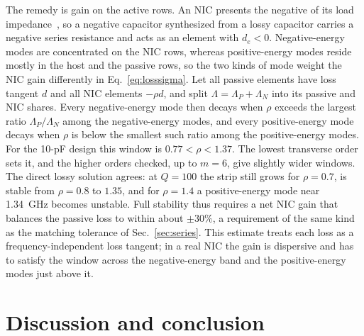 \documentclass[aps,prapplied,twocolumn,superscriptaddress,floatfix,longbibliography]{revtex4-2}
\begin{document}
The remedy is gain on the active rows. An NIC presents the negative of its load impedance~\cite{Linvill_1953:PIRE}, so a negative capacitor synthesized from a lossy capacitor carries a negative series resistance and acts as an element with $d_e<0$. Negative-energy modes are concentrated on the NIC rows, whereas positive-energy modes reside mostly in the host and the passive rows, so the two kinds of mode weight the NIC gain differently in Eq.~\eqref{eq:losssigma}. Let all passive elements have loss tangent $d$ and all NIC elements $-\rho d$, and split $\Lambda=\Lambda_P+\Lambda_N$ into its passive and NIC shares. Every negative-energy mode then decays when $\rho$ exceeds the largest ratio $\Lambda_P/\Lambda_N$ among the negative-energy modes, and every positive-energy mode decays when $\rho$ is below the smallest such ratio among the positive-energy modes. For the 10-pF design this window is $0.77<\rho<1.37$. The lowest transverse order sets it, and the higher orders checked, up to $m=6$, give slightly wider windows. The direct lossy solution agrees: at $Q=100$ the strip still grows for $\rho=0.7$, is stable from $\rho=0.8$ to $1.35$, and for $\rho=1.4$ a positive-energy mode near 1.34~GHz becomes unstable. Full stability thus requires a net NIC gain that balances the passive loss to within about $\pm30\%$, a requirement of the same kind as the matching tolerance of Sec.~\ref{sec:series}. This estimate treats each loss as a frequency-independent loss tangent; in a real NIC the gain is dispersive and has to satisfy the window across the negative-energy band and the positive-energy modes just above it.

\section{Discussion and conclusion}
\label{sec:discussion}
\end{document}
